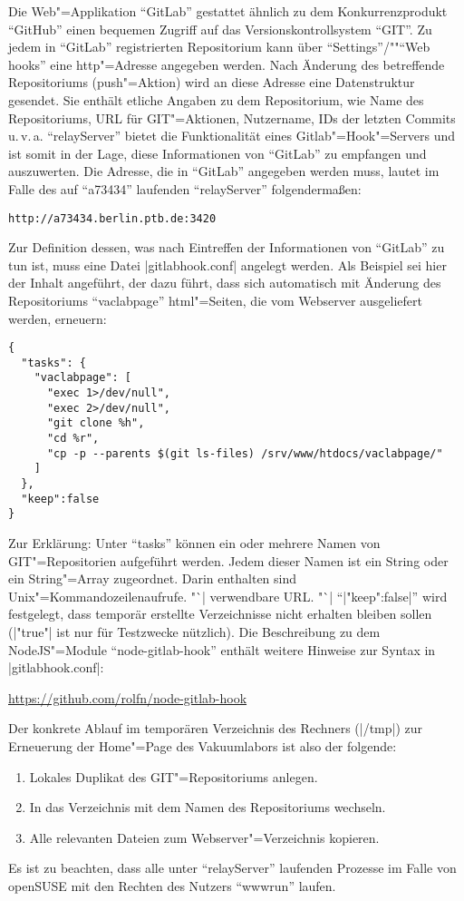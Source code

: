 \documentclass[titlepage=false,toc=nobibliography]{vl-report}
\newcommand*\theServer{relayServer}
\begin{document}
\noindent Die Web"=Applikation "`GitLab"' gestattet ähnlich zu dem Konkurrenzprodukt
"`GitHub"' einen bequemen Zugriff auf das Versionskontrollsystem "`GIT"'. Zu
jedem  in "`GitLab"' registrierten Repositorium kann über
"`Settings"'/"""`Web hooks"' eine http"=Adresse angegeben werden. Nach
Änderung des betreffende Repositoriums (push"=Aktion) wird an diese Adresse
eine Datenstruktur gesendet. Sie enthält etliche Angaben zu dem
Repositorium, wie Name des Repositoriums, URL für GIT"=Aktionen, Nutzername,
IDs der letzten Commits u.\,v.\,a. "`\theServer"' bietet die
Funktionalität eines Gitlab"=Hook"=Servers und ist somit in der Lage, diese
Informationen von "`GitLab"' zu empfangen und auszuwerten. Die Adresse, die
in "`GitLab"' angegeben werden muss, lautet im Falle des auf "`a73434"'
laufenden "`\theServer"' folgendermaßen:
\begin{lstlisting}[language={}]
  http://a73434.berlin.ptb.de:3420
\end{lstlisting}
Zur Definition dessen, was nach Eintreffen der
Informationen von "`GitLab"' zu tun ist, muss eine Datei |gitlabhook.conf|
angelegt werden. Als Beispiel sei hier der Inhalt angeführt, der dazu führt,
dass sich automatisch mit Änderung des Repositoriums "`vaclabpage"'
html"=Seiten, die vom Webserver ausgeliefert werden, erneuern:
\begin{lstlisting}[language={}]
{
  "tasks": {
    "vaclabpage": [
      "exec 1>/dev/null",
      "exec 2>/dev/null",
      "git clone %h",
      "cd %r",
      "cp -p --parents $(git ls-files) /srv/www/htdocs/vaclabpage/"
    ]
  },
  "keep":false
}
\end{lstlisting}%
%
Zur Erklärung: Unter "`tasks"' können ein oder mehrere Namen von
GIT"=Repositorien aufgeführt werden. Jedem dieser Namen ist ein String oder
ein String"=Array zugeordnet. Darin enthalten sind Unix"=Kommandozeilenaufrufe.
"`|%
verwendbare URL. "`|%
"`|"keep":false|"' wird festgelegt, dass temporär erstellte Verzeichnisse
nicht erhalten bleiben sollen (|"true"| ist nur für Testzwecke nützlich). Die
Beschreibung zu dem NodeJS"=Module "`node-gitlab-hook"' enthält weitere
Hinweise zur Syntax in |gitlabhook.conf|: \par\smallskip
\url{https://github.com/rolfn/node-gitlab-hook} \par\smallskip
\noindent
Der konkrete Ablauf im temporären Verzeichnis des Rechners
(|/tmp|) zur Erneuerung der Home"=Page des Vakuumlabors ist also der
folgende:
\begin{enumerate}
  \item Lokales Duplikat des GIT"=Repositoriums anlegen.
  \item In das Verzeichnis mit dem Namen des Repositoriums wechseln.
  \item Alle relevanten Dateien zum Webserver"=Verzeichnis kopieren.
\end{enumerate}
Es ist zu beachten, dass alle unter "`\theServer"' laufenden Prozesse
im Falle von openSUSE mit den Rechten des Nutzers "`wwwrun"' laufen.
\end{document}

